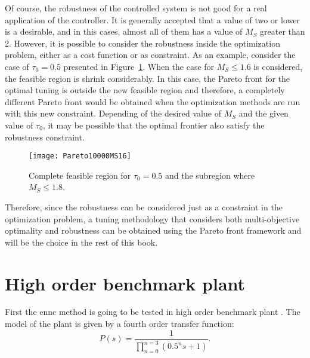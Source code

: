 Of course, the robustness of the controlled system is not good for a real application of the controller. It is generally accepted that a value of two or lower is a desirable, and in this cases, almost all of them has a value of $M_S$ greater than 2. However, it is possible to consider the robustness inside the optimization problem, either as a cost function or as constraint. As an example, consider the case of $\tau_0=0.5$ presented in Figure~\ref{fig:Pareto10000MS16}. When the case for $M_S\leq 1.6$ is considered, the feasible region is shrink considerably. In this case, the Pareto front for the optimal tuning is outside the new feasible region and therefore, a completely different Pareto front would be obtained when the optimization methods are run with this new constraint. Depending of the desired value of $M_S$ and the given value of $\tau_0$, it may be possible that the optimal frontier also satisfy the robustness constraint.
%
\begin{figure}%
\centering
\texttt{[image: Pareto10000MS16]}%
\caption{Complete feasible region for $\tau_0=0.5$ and the subregion where $M_S \leq 1.8$.}%
\label{fig:Pareto10000MS16}%
\end{figure}
%
Therefore, since the robustness can be considered just as a constraint in the optimization problem, a tuning methodology that considers both multi-objective optimality and robustness can be obtained using the Pareto front framework and will be the choice in the rest of this book.
%
%
\section{High order benchmark plant}
\label{sec:Bechmark}
First the \gls{ennc} method is going to be tested in high order benchmark plant \citep{Astroem2000}. The model of the plant is given by a fourth order transfer function:
\begin{equation}
P(s) = \frac{1}{\prod_{n=0}^{n=3}(0.5^n s+1)}.
\label{eq:benchmarkTF}
\end{equation}

